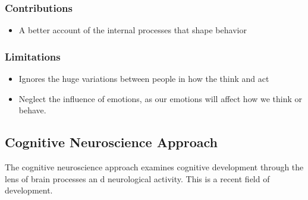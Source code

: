 \documentclass[../main/main.tex]{subfiles}
\begin{document}
\subsubsection{Contributions}
\begin{itemize}
        \item A better account of the internal processes that shape behavior
\end{itemize}

\subsubsection{Limitations}
\begin{itemize}
  \item Ignores the huge variations between people in how the think and act
        \item Neglect the influence of emotions, as our emotions will affect how we think or behave.
\end{itemize}



\subsection{Cognitive Neuroscience Approach}

The cognitive neuroscience approach examines cognitive development through the lens of brain processes an d neurological activity. This is a recent field of development.
\end{document}
